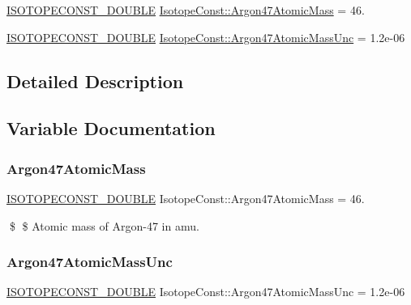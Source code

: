\begin{DoxyCompactItemize}
\item 
\mbox{\hyperlink{group___isotope_const-_macros_ga8f45a7272ce02c0b4c65c44636ed719a}{I\+S\+O\+T\+O\+P\+E\+C\+O\+N\+S\+T\+\_\+\+D\+O\+U\+B\+LE}} \mbox{\hyperlink{group___isotope_const-_argon-_ar47_ga7ddc49f239547b53e38ae04272d60754}{Isotope\+Const\+::\+Argon47\+Atomic\+Mass}} = 46.
\item 
\mbox{\hyperlink{group___isotope_const-_macros_ga8f45a7272ce02c0b4c65c44636ed719a}{I\+S\+O\+T\+O\+P\+E\+C\+O\+N\+S\+T\+\_\+\+D\+O\+U\+B\+LE}} \mbox{\hyperlink{group___isotope_const-_argon-_ar47_ga4242322159393ff34d1f3bcf900e90fb}{Isotope\+Const\+::\+Argon47\+Atomic\+Mass\+Unc}} = 1.\+2e-\/06
\end{DoxyCompactItemize}


\subsection{Detailed Description}


\subsection{Variable Documentation}
\mbox{\label{group___isotope_const-_argon-_ar47_ga7ddc49f239547b53e38ae04272d60754}} 
\subsubsection{\texorpdfstring{Argon47\+Atomic\+Mass}{Argon47AtomicMass}}
{\footnotesize\ttfamily \mbox{\hyperlink{group___isotope_const-_macros_ga8f45a7272ce02c0b4c65c44636ed719a}{I\+S\+O\+T\+O\+P\+E\+C\+O\+N\+S\+T\+\_\+\+D\+O\+U\+B\+LE}} Isotope\+Const\+::\+Argon47\+Atomic\+Mass = 46.}

\$ \$ Atomic mass of Argon-\/47 in amu. \mbox{\label{group___isotope_const-_argon-_ar47_ga4242322159393ff34d1f3bcf900e90fb}} 
\subsubsection{\texorpdfstring{Argon47\+Atomic\+Mass\+Unc}{Argon47AtomicMassUnc}}
{\footnotesize\ttfamily \mbox{\hyperlink{group___isotope_const-_macros_ga8f45a7272ce02c0b4c65c44636ed719a}{I\+S\+O\+T\+O\+P\+E\+C\+O\+N\+S\+T\+\_\+\+D\+O\+U\+B\+LE}} Isotope\+Const\+::\+Argon47\+Atomic\+Mass\+Unc = 1.\+2e-\/06}

